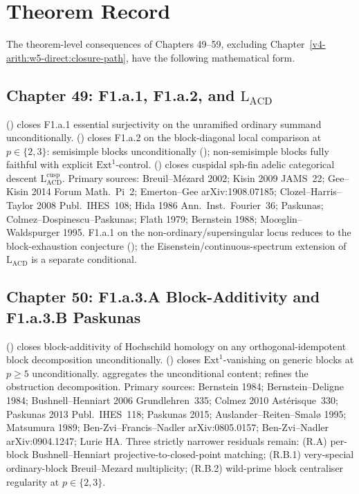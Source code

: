 \section{Theorem Record}
\label{v4-arith:w5-synth:per-chapter}

The theorem-level consequences of Chapters 49--59, excluding
Chapter~\ref{v4-arith:w5-direct:closure-path}, have the following
mathematical form.

\subsection{Chapter 49: F1.a.1, F1.a.2, and \(\mathrm{L}_{\mathrm{ACD}}\)}
\label{v4-arith:w5-synth:ch49}

 (\ClaimStatusProvedHere)
closes F1.a.1 essential surjectivity on the unramified ordinary
summand unconditionally.
 (\ClaimStatusProvedHere) closes F1.a.2
on the block-diagonal local comparison at \(p\in\{2,3\}\): semisimple
blocks unconditionally
(); non-semisimple blocks
fully faithful with explicit \(\mathrm{Ext}^{1}\)-control.
 (\ClaimStatusProvedHere)
closes cuspidal sph-fin adelic categorical descent
\(\mathrm{L}_{\mathrm{ACD}}^{\mathrm{cusp}}\).
Primary sources: Breuil--M{\'e}zard 2002; Kisin 2009 JAMS~22;
Gee--Kisin 2014 Forum Math.~Pi~2; Emerton--Gee arXiv:1908.07185;
Clozel--Harris--Taylor 2008 Publ.~IHES~108; Hida 1986
Ann.~Inst.~Fourier~36; Paskunas; Colmez--Dospinescu--Paskunas;
Flath 1979; Bernstein 1988; Mo{\oe}glin--Waldspurger 1995.
F1.a.1 on the non-ordinary/supersingular locus reduces to the
block-exhaustion conjecture
();
the Eisenstein/continuous-spectrum extension of
\(\mathrm{L}_{\mathrm{ACD}}\) is a separate conditional.

\subsection{Chapter 50: F1.a.3.A Block-Additivity and F1.a.3.B Paskunas}
\label{v4-arith:w5-synth:ch50}

 (\ClaimStatusProvedHere)
closes block-additivity of Hochschild homology on any
orthogonal-idempotent block decomposition unconditionally.
 (\ClaimStatusProvedHere)
closes \(\mathrm{Ext}^{1}\)-vanishing on generic blocks at \(p\geq 5\)
unconditionally.
 aggregates the
unconditional content;
 refines the
obstruction decomposition.
Primary sources: Bernstein 1984; Bernstein--Deligne 1984;
Bushnell--Henniart 2006 Grundlehren~335; Colmez 2010
Ast\'erisque~330; Paskunas 2013 Publ.~IHES~118; Paskunas 2015;
Auslander--Reiten--Smal\o{} 1995; Matsumura 1989;
Ben-Zvi--Francis--Nadler arXiv:0805.0157; Ben-Zvi--Nadler
arXiv:0904.1247; Lurie HA.
Three strictly narrower residuals remain: (R.A) per-block
Bushnell--Henniart projective-to-closed-point matching; (R.B.1)
very-special ordinary-block Breuil--Mezard multiplicity; (R.B.2)
wild-prime block centraliser regularity at \(p\in\{2,3\}\).

